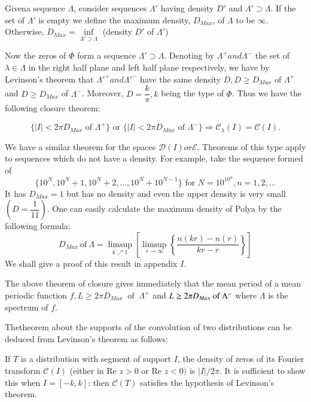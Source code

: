 \begin{defi*}
 Given\pageoriginale a sequence $\Lambda$, consider sequences $\Lambda'$ having
 density $D'$ and $\Lambda' \supset \Lambda$. If the set of $\Lambda'$
 is empty we define the maximum density, $D_{Max}$, of $\Lambda$ to
 be $\infty$. Otherwise, $D_{Max} = \inf\limits_{\Lambda' \supset
 \Lambda}$ (density $D'$ of $\Lambda'$) 
\end{defi*}

Now the zeros of $\Phi$ form a sequence $\Lambda' \supset
\Lambda$. Denoting by $\Lambda^+ and \Lambda^-$ the set of $\lambda
\in \Lambda$ in the right half plane and left half plane respectively,
we have by Levinson's theorem that $\Lambda'^{+} and \Lambda'^{-}$ have the
same density $D, D \ge D_{Max}$ of $\Lambda^+$ and $D \ge D_{Max}$ of
$\Lambda^-$. Moreover, $D = \dfrac{k}{\pi}, k$ being the type of
$\Phi$. Thus we have the following closure theorem: 

\begin{theorem*}[(Levison)]
 $$
 \{ |I| < 2 \pi D_{Max} \text{ of }\Lambda^+ \}\text{ or }\{ |I| <
 2 \pi D_{Max}\text{ of } \Lambda^- \} \Rightarrow
 \mathscr{C}_{\lambda}(I) = \mathscr{C} (I). 
 $$
\end{theorem*}

We have a similar theorem for the spaces $\mathscr{D}(I) or
\mathscr{E}$. Theorems of this type apply to sequences which do not
have a density. For example, take the sequence formed of 
$$
\{ 10^N, 10^N + 1, 10^N + 2, \ldots, 10^N + 10^{N-1} \} \text{ for }
N = 10^{10^n}, n= 1, 2, \ldots 
$$
It has $D_{Max} = 1$ but has no density and even the upper density is
very small $(D = \dfrac{1}{11})$. One can easily calculate the
maximum density of Polya by the following formula: 
$$
D_{Max}~ \text{of}~ \Lambda = \limsup_{k \nearrow 1} \left[ \limsup_{r
 \rightarrow \infty} \left\{\frac{n(kr) - n(r)}{kr - r} \right\}\right] 
$$
We shall give a proof of this result in appendix $I$.

The above theorem of closure gives immediately that the mean period of
a mean periodic function $f, L \ge 2 \pi D_{Max}~\text{ of }~\Lambda^+$ and $L
\ge 2 \pi\break D_{Max} ~\text{of}~ \Lambda^-$ where $\Lambda$ is the spectrum of
$f$. 

The\pageoriginale theorem about the supports of the convolution of two distributions
can be deduced from Levinson's theorem as follows: 

If $T$ is a distribution with segment of support $I$, the density of
zeros of its Fourier transform $\mathscr{C}(I)$ (either in Re $z > 0$
or Re $z < 0)$ is $|I| /2 \pi$. It is sufficient to show this when $I
= [-k, k]$: then $\mathscr{C}(T)$ satisfies the hypothesis of
Levinson's theorem. 

